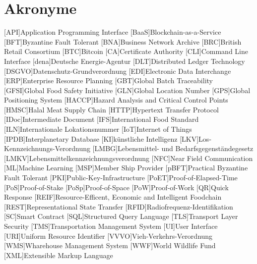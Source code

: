 \section*{Akronyme}            %
\begin{acronym}[HACCP]
  [API]{Application Programming Interface}
	[BaaS]{Blockchain-as-a-Service}
  [BFT]{Byzantine Fault Tolerant}
  [BNA]{Business Network Archive}
  [BRC]{British Retail Consortium}
	[BTC]{Bitcoin}
  [CA]{Certificate Authority}
  [CLI]{Command Line Interface}
	[dena]{Deutsche Energie-Agentur}
	[DLT]{Distributed Ledger Technology}
  [DSGVO]{Datenschutz-Grundverordnung}
  [EDI]{Electronic Data Interchange}
  [ERP]{Enterprise Resource Planning}
  [GBT]{Global Batch Traceability}
  [GFSI]{Global Food Safety Initiative}
  [GLN]{Global Location Number}
  [GPS]{Global Positioning System}
  [HACCP]{Hazard Analysis and Critical Control Points}
  [HMSC]{Halal Meat Supply Chain}
  [HTTP]{Hypertext Transfer Protocol}
  [IDoc]{Intermediate Document}
  [IFS]{International Food Standard}
  [ILN]{Internationale Lokationsnummer}
  [IoT]{Internet of Things}
  [IPDB]{Interplanetary Database}
  [KI]{künstliche Intelligenz}
  [LKV]{Los-Kennzeichnungs-Verordnung}
  [LMBG]{Lebensmittel- und Bedarfsgegenständegesetz}
  [LMKV]{Lebensmittelkennzeichnungsverordnung}
  [NFC]{Near Field Communication}
	[ML]{Machine Learning}
  [MSP]{Member Ship Provider}
  [pBFT]{Practical Byzantine Fault Tolerant}
  [PKI]{Public-Key-Infrastructure}
  [PoET]{Proof-of-Elapsed-Time}
  [PoS]{Proof-of-Stake}
  [PoSp]{Proof-of-Space}
  [PoW]{Proof-of-Work}
  [QR]{Quick Response}
  [REIF]{Resource-Efficent, Economic and Intelligent Foodchain}
  [REST]{Representational State Transfer}
  [RFID]{Radiofrequenz-Identifikation}
	[SC]{Smart Contract}
  [SQL]{Structured Query Language}
  [TLS]{Transport Layer Security}
  [TMS]{Transportation Management System}
  [UI]{User Interface}
  [URI]{Uniform Resource Identifier}
  [VVVO]{Vieh-Verkehrs-Verordnung}
  [WMS]{Wharehouse Management System}
  [WWF]{World Wildlife Fund}
  [XML]{Extensible Markup Language}
\end{acronym}

\newpage

\listoffigures
{}
\listoftables
{}
\lstlistoflistings
{}
\newpage
